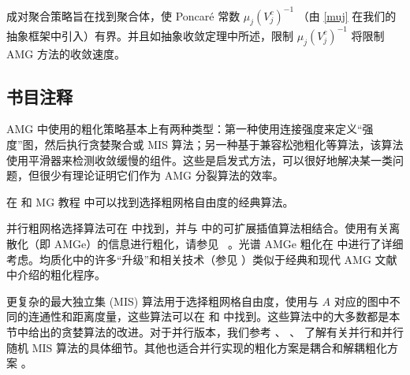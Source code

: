 \documentclass[12pt]{acta_2011xz}
\begin{document}
成对聚合策略旨在找到聚合体，使 Poncar\'{e} 常数    $\mu_j(V_j^c)^{-1}$    （由    \eqref{muj}    在我们的抽象框架中引入）有界。并且如抽象收敛定理中所述，限制    $\mu_j(V_j^c)^{-1}$    将限制 AMG 方法的收敛速度。  

   \subsection{书目注释  }       \label{s:coarsening-biblio}    AMG 中使用的粗化策略基本上有两种类型：第一种使用连接强度来定义“强度”图，然后执行贪婪聚合或 MIS 算法；另一种基于兼容松弛粗化等算法，该算法使用平滑器来检测收敛缓慢的组件。这些是启发式方法，可以很好地解决某一类问题，但很少有理论证明它们作为 AMG 分裂算法的效率。  

在
   \cite{1stAMG,Stuben.K.1983a,Brandt.A;McCormick.S;Ruge.J.1985a,Ruge.J;Stuben.K.1987a}    和 MG 教程    \cite{Briggs.W;Henson.V;McCormick.S.2000a}    中可以找到选择粗网格自由度的经典算法。  

并行粗网格选择算法可在
   \cite{Sterck.H;Yang.U;Heys.J.2006a}    中找到，并与
   \cite{De-Sterck.H;Falgout.R;Nolting.J;Yang.U.2008a}    中的可扩展插值算法相结合。使用有关离散化（即 AMGe）的信息进行粗化，请参见~
   \cite{Jones.J;Vassilevski.P.2001a,Brezina.M;Cleary.A;Falgout.R;Henson.V;Jones.J;Manteuffel.T;McCormick.S;Ruge.J.2001a}    。光谱 AMGe 粗化在
   \cite{Chartier.T;Falgout.R;Henson.V;Jones.J;Manteuffel.T;McCormick.S;Ruge.J;Vassilevski.P.2003b}    中进行了详细考虑。均质化中的许多“升级”和相关技术（参见    \cite{efendiev2000convergence,hou1999convergence}    ）类似于经典和现代 AMG 文献中介绍的粗化程序。  

更复杂的最大独立集 (MIS) 算法用于选择粗网格自由度，使用与    $A$    对应的图中不同的连通性和距离度量，这些算法可以在    \cite{Ruge.J;Stuben.K.1987a}    和
   \cite[Appendix~A]{Trottenberg.U;Oosterlee.C;Schuller.A.2001a}    中找到。这些算法中的大多数都是本节中给出的贪婪算法的改进。对于并行版本，我们参考
   \cite{1986LubyM-aa}    、    \cite{1998ClearyA_FalgoutR_HensonV_JonesJ-aa}    、
   \cite{Sterck.H;Yang.U;Heys.J.2006a}    了解有关并行和并行随机 MIS 算法的具体细节。其他也适合并行实现的粗化方案是耦合和解耦粗化方案
   \cite{Yang.U.2006a,Henson.V;Yang.U.2002a}    。  
\end{document}
